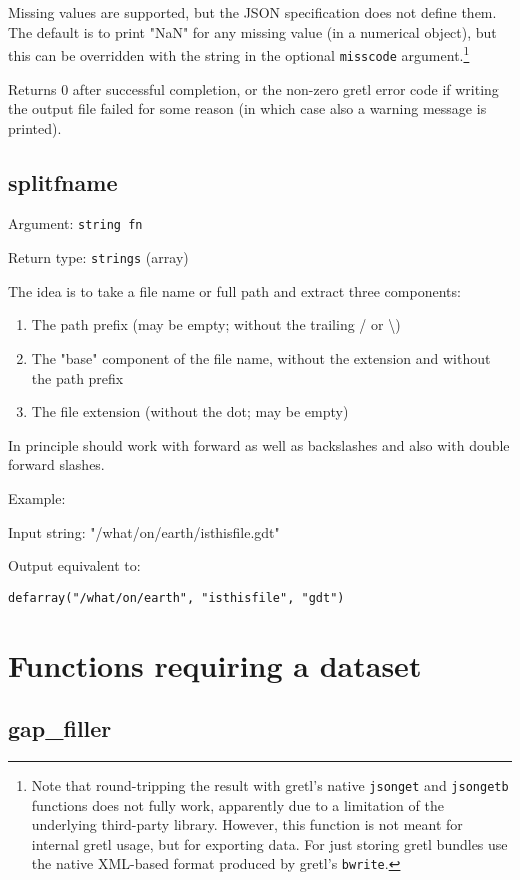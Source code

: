 \documentclass[11pt,english]{article}
\begin{document}
Missing values are supported, but the JSON specification does not define them. The 
default is to print "NaN" for any missing value (in a numerical object), but this can 
be overridden with the string in the optional \texttt{misscode} argument.\footnote{Note 
that round-tripping the result with gretl's native \texttt{jsonget} and \texttt{jsongetb} 
functions does not fully work, apparently due to a limitation of the underlying third-party
library. However, this function is not meant for internal gretl usage, but for exporting data.
For just storing gretl bundles use the native XML-based format produced by gretl's
\texttt{bwrite}.}

Returns 0 after successful completion, or the non-zero gretl error code if writing the 
output file failed for some reason (in which case also a warning message is printed).

\subsection{splitfname}

Argument: \texttt{string fn}

\noindent Return type: \texttt{strings} (array)

The idea is to take a file name or full path and extract three components:
\begin{enumerate}
\item The path prefix (may be empty; without the trailing / or \textbackslash)
\item The "base" component of the file name, without the extension and without the path prefix 
\item The file extension (without the dot; may be empty)
\end{enumerate}	
In principle should work with forward as well as backslashes and also with double forward slashes.

Example:

Input string: "/what/on/earth/isthisfile.gdt"

Output equivalent to: 

\texttt{defarray("/what/on/earth", "isthisfile", "gdt")}


\section{Functions requiring a dataset}

\subsection{gap\_filler}
\end{document}
